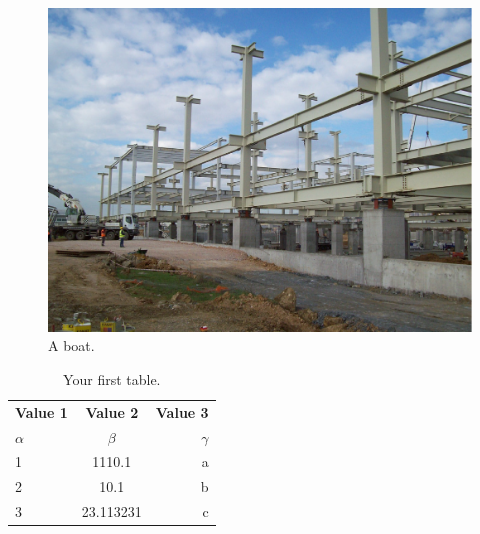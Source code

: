 \documentclass[english]{eqconf}
\begin{document}
\begin{figure}
	\begin{center}
		\includegraphics[scale=0.4]{b.PNG}
		\caption{A boat.}
		\label{fig:boat1}
\end{center}
\end{figure}


\blindtext

\blindtext

\blindtext

\blindtext

\blindtext \blindtext \blindtext \blindtext

\begin{table}[h!]
	\begin{center}
		\caption{Your first table.}
		\label{tab:table1}
		\begin{tabular}{l|c|r} %
			\textbf{Value 1} & \textbf{Value 2} & \textbf{Value 3}\\
			$\alpha$ & $\beta$ & $\gamma$ \\
			\hline
			1 & 1110.1 & a\\
			2 & 10.1 & b\\
			3 & 23.113231 & c\\
		\end{tabular}
	\end{center}
\end{table}

\blindtext

\blindtext

\blindtext

\blindtext

\blindtext

\blindtext
\end{document}
